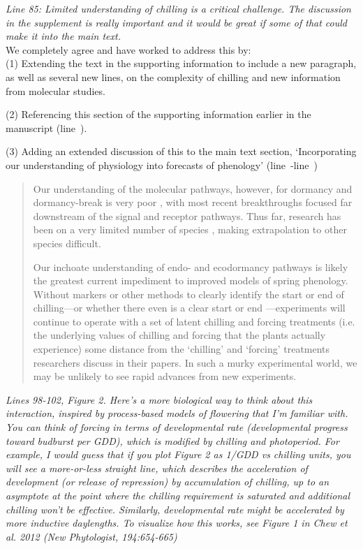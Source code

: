 \documentclass[11pt,letter]{article}
\newcommand{\lr}[1]{line~\lineref{#1}}
\begin{document}
\emph{Line 85: Limited understanding of chilling is a critical challenge. The discussion in the supplement is really important and it would be great if some of that could make it into the main text.  }\\

We completely agree and have worked to address this by:\\

(1) Extending the text in the supporting information to include a new paragraph, as well as several new lines, on the complexity of chilling and new information from molecular studies.

(2) Referencing this section of the supporting information earlier in the manuscript (\lr{addreftochillsupp}).

(3) Adding an extended discussion of this to the main text section, `Incorporating our understanding of physiology into forecasts of phenology' (\lr{r2moredormstart}-\lr{r2moredormend})
\begin{quote} Our understanding of the molecular pathways, however, for dormancy and dormancy-break is very poor \citep[especially when compared to our understanding of flowering time pathways,][]{Azeez2021}, with most recent breakthroughs  focused far downstream of the signal and receptor pathways. Thus far, research has been on a very limited number of species \citep{Singh:2017,rinne2018}, making extrapolation to other species difficult. 

Our inchoate understanding of endo- and ecodormancy pathways is likely the greatest current impediment to improved models of spring phenology. Without markers or other methods to clearly identify the start or end of chilling---or whether there even is a clear start or end \citep[as opposed to potential parallel models of chilling and forcing,][]{harrington2015}---experiments will continue to operate with a set of latent chilling and forcing treatments (i.e. the underlying values of chilling and forcing that the plants actually experience) some distance from the `chilling' and `forcing' treatments researchers discuss in their papers. In such a murky experimental world, we may be unlikely to see rapid advances from new experiments.
\end{quote}


\emph{Lines 98-102, Figure 2.  Here's a more biological way to think about this interaction, inspired by process-based models of flowering that I'm familiar with. You can think of forcing in terms of developmental rate (developmental progress toward budburst per GDD), which is modified by chilling and photoperiod.  For example, I would guess that if you plot Figure 2 as 1/GDD vs chilling units, you will see a more-or-less straight line, which describes the acceleration of development (or release of repression) by accumulation of chilling, up to an asymptote at the point where the chilling requirement is saturated and additional chilling won't be effective.  Similarly, developmental rate might be accelerated by more inductive daylengths. To visualize how this works, see Figure 1 in Chew et al. 2012 (New Phytologist, 194:654-665) }\\
\end{document}
